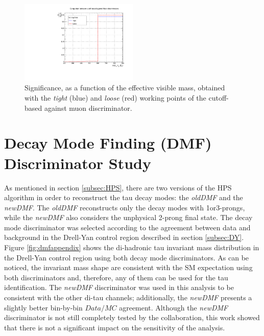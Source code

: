  
\begin{figure}[ht]
\begin{center}
\captionsetup[subfloat]{farskip=0pt,captionskip=0.0cm,labelformat=empty}
\includegraphics[clip,width=0.5\textwidth]{figuras/AppendiceB/againstMuonWP/againstMuon.pdf}
\caption{Significance, as a function of the effective visible mass, obtained with the 
\textit{tight} (blue) and  \textit{loose} (red) working points of the cutoff-based against muon discriminator. \label{fig:muonappendix}}
\end{center}
\end{figure}

\section{Decay Mode Finding (DMF) Discriminator Study}
\label{Results:TauID-DMFDicr}

\noindent As mentioned in section \ref{subsec:HPS}, there are two versions
of the HPS algorithm in order to reconstruct the tau decay modes: the 
\textit{oldDMF} and the \textit{newDMF}. The \textit{oldDMF} reconstructs only 
the decay modes with 1or3-prongs, while the \textit{newDMF} also considers
the unphysical 2-prong final state. The decay mode discriminator was selected
according to the agreement between data and background in the Drell-Yan control 
region described in section \ref{subsec:DY}. Figure \ref{fig:dmfappendix} shows the 
di-hadronic tau invariant mass distribution in the Drell-Yan control region 
using both decay mode discriminators. As can be noticed, the invariant mass 
shape are consistent with the SM expectation using both discriminators and, therefore,
any of them can be used for the tau identification. The \textit{newDMF} discriminator was used in 
this analysis to be consistent with the other di-tau channels; additionally,
the \textit{newDMF} presents a slightly better bin-by-bin $Data/MC$ agreement. Although the \textit{newDMF} discriminator is not still completely
tested by the collaboration, this work showed that there is not a 
significant impact on the sensitivity of the analysis.

